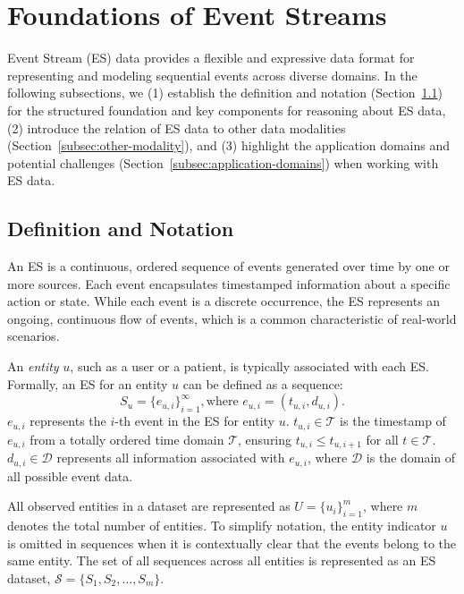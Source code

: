 \documentclass[twoside,11pt]{article}
\begin{document}
\section{Foundations of Event Streams}
\label{sec:event-stream-data}

Event Stream (ES) data provides a flexible and expressive data format for representing and modeling sequential events across diverse domains. In the following subsections, we (1) establish the definition and notation (Section~\ref{subsec:def-notation}) for the structured foundation and key components for reasoning about ES data, (2) introduce the relation of ES data to other data modalities (Section~\ref{subsec:other-modality}), and (3) highlight the application domains and potential challenges  (Section~\ref{subsec:application-domains}) when working with ES data.

\subsection{Definition and Notation}
\label{subsec:def-notation}

An ES is a continuous, ordered sequence of events generated over time by one or more sources. Each event encapsulates timestamped information about a specific action or state. While each event is a discrete occurrence, the ES represents an ongoing, continuous flow of events, which is a common characteristic of real-world scenarios.

An \textit{entity} $u$, such as a user or a patient, is typically associated with each ES. Formally, an ES for an entity $u$ can be defined as a sequence: 
\begin{equation}
\label{eq:es-def}
S_u = {\{e_{u,i}\}}^\infty_{i=1}, \text{where } e_{u,i} = (t_{u,i}, d_{u,i}).
\end{equation}
$e_{u,i}$ represents the $i$-th event in the ES for entity $u$. $t_{u,i} \in \mathcal{T}$ is the timestamp of $e_{u,i}$ from a totally ordered time domain $\mathcal{T}$, ensuring $t_{u,i} \leq t_{u,i+1}$ for all $t \in \mathcal{T}$. $d_{u,i} \in \mathcal{D}$ represents all information associated with $e_{u,i}$, where $\mathcal{D}$ is the domain of all possible event data.

All observed entities in a dataset are represented as $U = \{u_i\}_{i=1}^m$, where $m$ denotes the total number of entities. To simplify notation, the entity indicator $u$ is omitted in sequences when it is contextually clear that the events belong to the same entity. The set of all sequences across all entities is represented as an ES dataset, $\mathcal{S} = \{S_1, S_2, \ldots, S_m\}$. 
\end{document}

